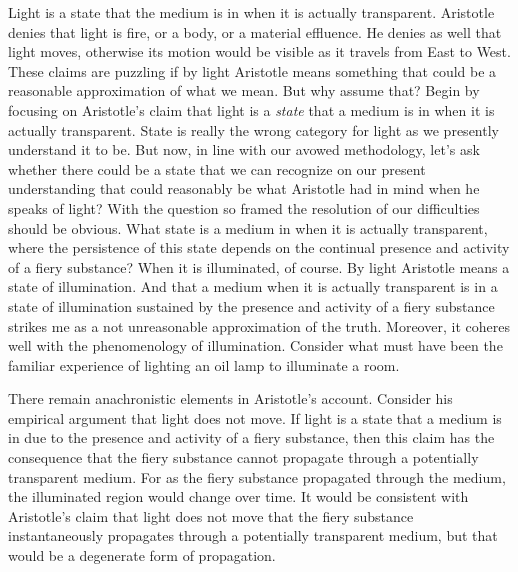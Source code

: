 \documentclass[12pt]{article}
\begin{document}
Light is a state that the medium is in when it is actually transparent. Aristotle denies that light is fire, or a body, or a material effluence. He denies as well that light moves, otherwise its motion would be visible as it travels from East to West. These claims are puzzling if by light Aristotle means something that could be a reasonable approximation of what we mean. But why assume that? Begin by focusing on Aristotle's claim that light is a \emph{state} that a medium is in when it is actually transparent. State is really the wrong category for light as we presently understand it to be. But now, in line with our avowed methodology, let's ask whether there could be a state that we can recognize on our present understanding that could reasonably be what Aristotle had in mind when he speaks of light? With the question so framed the resolution of our difficulties should be obvious. What state is a medium in when it is actually transparent, where the persistence of this state depends on the continual presence and activity of a fiery substance? When it is illuminated, of course. By light Aristotle means a state of illumination. And that a medium when it is actually transparent is in a state of illumination sustained by the presence and activity of a fiery substance strikes me as a not unreasonable approximation of the truth. Moreover, it coheres well with the phenomenology of illumination. Consider what must have been the familiar experience of lighting an oil lamp to illuminate a room.

There remain anachronistic elements in Aristotle's account. Consider his empirical argument that light does not move. If light is a state that a medium is in due to the presence and activity of a fiery substance, then this claim has the consequence that the fiery substance cannot propagate through a potentially transparent medium. For as the fiery substance propagated through the medium, the illuminated region would change over time. It would be consistent with Aristotle's claim that light does not move that the fiery substance instantaneously propagates through a potentially transparent medium, but that would be a degenerate form of propagation.




 
 
\end{document}
